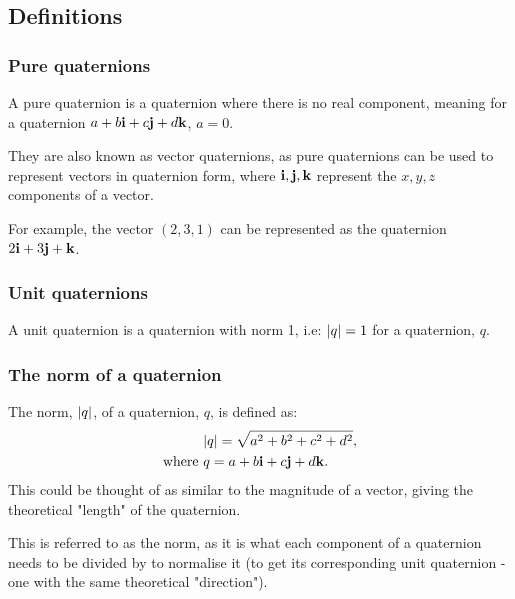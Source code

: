 \documentclass[12pt]{article}
\theoremstyle{definition}
\begin{document}
\subsection{Definitions}

\subsubsection{Pure quaternions}

A pure quaternion is a quaternion where there is no real component, meaning for a quaternion $a + b\vb{i} + c\vb{j} + d\vb{k}$, $a = 0$. \cite{Math431}

They are also known as vector quaternions, as pure quaternions can be used to represent vectors in quaternion form, where $\vb{i, j, k}$ represent the $x, y, z$ components of a vector.

For example, the vector $(2,3,1)$ can be represented as the quaternion $2\vb{i} + 3\vb{j} + \vb{k}$.

\subsubsection{Unit quaternions}

A unit quaternion is a quaternion with norm 1, i.e: $\abs{q} = 1$ for a quaternion, $q$. \cite{DRose}

\subsubsection{The norm of a quaternion}

The norm, $\abs{q}$, of a quaternion, $q$, is defined as:
\begin{equation}
    \begin{aligned}
        &\abs{q} = \sqrt{a^2 + b^2 + c^2 + d^2}, \\
        \text{where } & q = a + b\vb{i} + c\vb{j} + d\vb{k}.
    \end{aligned} 
\end{equation}
This could be thought of as similar to the magnitude of a vector, giving the theoretical "length" of the quaternion. \cite{Math431}

This is referred to as the norm, as it is what each component of a quaternion needs to be divided by to normalise it (to get its corresponding unit quaternion - one with the same theoretical "direction").
\end{document}
